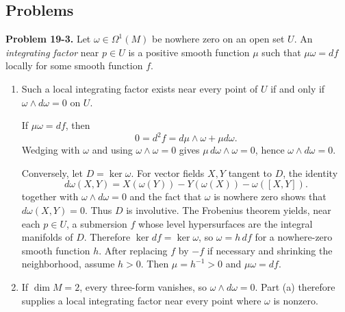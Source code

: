 \documentclass[11pt]{amsart}
\theoremstyle{definition}
\newcommand{\problemhead}[1]{\medskip\noindent\textbf{Problem #1.} }
\begin{document}
\subsection*{Problems}

\problemhead{19-3}
Let $\omega\in\Omega^1(M)$ be nowhere zero on an open set $U$.  An
\emph{integrating factor} near $p\in U$ is a positive smooth function
$\mu$ such that $\mu\omega=df$ locally for some smooth function $f$.

\begin{enumerate}
\item[(a)] Such a local integrating factor exists near every point of
$U$ if and only if $\omega\wedge d\omega=0$ on $U$.

If $\mu\omega=df$, then
\[
  0=d^2f=d\mu\wedge\omega+\mu d\omega.
\]
Wedging with $\omega$ and using $\omega\wedge\omega=0$ gives
$\mu\,d\omega\wedge\omega=0$, hence $\omega\wedge d\omega=0$.

Conversely, let $D=\ker\omega$.  For vector fields $X,Y$ tangent to
$D$, the identity
\[
  d\omega(X,Y)=X(\omega(Y))-Y(\omega(X))-\omega([X,Y]).
\]
together with $\omega\wedge d\omega=0$ and the fact that $\omega$ is
nowhere zero shows that $d\omega(X,Y)=0$.  Thus $D$ is involutive.
The Frobenius theorem yields, near each $p\in U$, a submersion $f$ whose
level hypersurfaces are the integral manifolds of $D$.  Therefore
$\ker df=\ker\omega$, so $\omega=h\,df$ for a nowhere-zero smooth
function $h$.  After replacing $f$ by $-f$ if necessary and shrinking
the neighborhood, assume $h>0$.  Then $\mu=h^{-1}>0$ and
$\mu\omega=df$.

\item[(b)] If $\dim M=2$, every three-form vanishes, so
$\omega\wedge d\omega=0$.  Part (a) therefore supplies a local
integrating factor near every point where $\omega$ is nonzero.
\end{enumerate}
\end{document}
